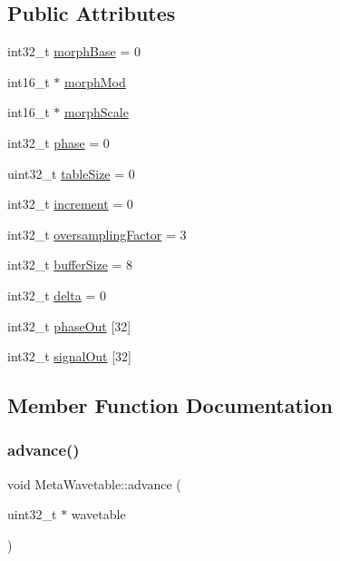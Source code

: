 \subsection*{Public Attributes}
\begin{DoxyCompactItemize}
\item 
int32\+\_\+t \mbox{\hyperlink{class_meta_wavetable_ad9c0709da7fb7ae141475878e94af2cd}{morph\+Base}} = 0
\item 
int16\+\_\+t $\ast$ \mbox{\hyperlink{class_meta_wavetable_abbf70d38e3bf2c66dde68b1237316b9a}{morph\+Mod}}
\item 
int16\+\_\+t $\ast$ \mbox{\hyperlink{class_meta_wavetable_a67558f0d34b8cb4e3402081081c51194}{morph\+Scale}}
\item 
int32\+\_\+t \mbox{\hyperlink{class_meta_wavetable_a2bf730b399f2ef67af5c7f51e9de54ed}{phase}} = 0
\item 
uint32\+\_\+t \mbox{\hyperlink{class_meta_wavetable_aacf77c49de6338ed07e3dc6c0fa743e4}{table\+Size}} = 0
\item 
int32\+\_\+t \mbox{\hyperlink{class_meta_wavetable_a130ca9840d50c5d0d2126dcdd6c0d7fa}{increment}} = 0
\item 
int32\+\_\+t \mbox{\hyperlink{class_meta_wavetable_aa35a6e715f9e52cacdb33dc6c2a924e2}{oversampling\+Factor}} = 3
\item 
int32\+\_\+t \mbox{\hyperlink{class_meta_wavetable_aab39095a3b8f5205c2372f0f5937751f}{buffer\+Size}} = 8
\item 
int32\+\_\+t \mbox{\hyperlink{class_meta_wavetable_a08f81ac2000a3fb41df3fd67deeba85f}{delta}} = 0
\item 
int32\+\_\+t \mbox{\hyperlink{class_meta_wavetable_a14da8d5dfe35682dcc2d777f8f591e7d}{phase\+Out}} \mbox{[}32\mbox{]}
\item 
int32\+\_\+t \mbox{\hyperlink{class_meta_wavetable_a7794d98f59ddc333a8f3489bfd102558}{signal\+Out}} \mbox{[}32\mbox{]}
\end{DoxyCompactItemize}


\subsection{Member Function Documentation}
\mbox{\label{class_meta_wavetable_a7026d610900dc8549277f37fd8f56d80}} 
\subsubsection{\texorpdfstring{advance()}{advance()}}
{\footnotesize\ttfamily void Meta\+Wavetable\+::advance (\begin{DoxyParamCaption}\item[{uint32\+\_\+t $\ast$}]{wavetable }\end{DoxyParamCaption})\hspace{0.3cm}{\ttfamily [inline]}}

